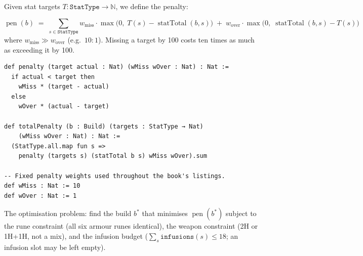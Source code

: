 \documentclass[11pt, a4paper, oneside]{book}
\newcommand{\N}{\mathbb{N}}
\newcommand{\pen}{\operatorname{pen}}
\newcommand{\statTotal}{\operatorname{statTotal}}
\begin{document}
Given stat targets $T : \texttt{StatType} \to \N$, we define the penalty:

\begin{defbox}[title={Asymmetric Penalty}]
\[
  \pen(b) \;=\; \sum_{s \in \texttt{StatType}}
    w_{\text{miss}} \cdot \max\!\big(0,\; T(s) - \statTotal(b, s)\big)
    \;+\;
    w_{\text{over}} \cdot \max\!\big(0,\; \statTotal(b, s) - T(s)\big)
\]
where $w_{\text{miss}} \gg w_{\text{over}}$ (e.g.\ $10 : 1$).  Missing a
target by 100 costs ten times as much as exceeding it by 100.
\end{defbox}

\begin{leanbox}[title={Lean 4 --- Penalty}]
\begin{verbatim}
def penalty (target actual : Nat) (wMiss wOver : Nat) : Nat :=
  if actual < target then
    wMiss * (target - actual)
  else
    wOver * (actual - target)

def totalPenalty (b : Build) (targets : StatType → Nat)
    (wMiss wOver : Nat) : Nat :=
  (StatType.all.map fun s =>
    penalty (targets s) (statTotal b s) wMiss wOver).sum

-- Fixed penalty weights used throughout the book's listings.
def wMiss : Nat := 10
def wOver : Nat := 1
\end{verbatim}
\end{leanbox}

The optimisation problem: find the build $b^*$ that minimises
$\pen(b^*)$ subject to the rune constraint (all six armour runes identical),
the weapon constraint (2H or 1H+1H, not a mix), and the infusion budget
($\sum_s \texttt{infusions}(s) \leq 18$; an infusion slot may be left empty).
\end{document}
